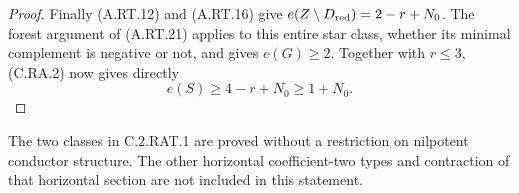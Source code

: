 \begin{proof}
Finally (A.RT.12) and (A.RT.16) give
$e(Z\setminus D_{\rm red})=2-r+N_0$.
The forest argument of (A.RT.21) applies to this entire
star class, whether its minimal complement is negative
or not, and gives $e(G)\ge2$.
Together with $r\le3$, (C.RA.2) now gives directly
\[
                 e(S)\ge4-r+N_0\ge1+N_0.
 \tag{C.RA.17}
\]
\end{proof}

The two classes in C.2.RAT.1 are proved without a restriction
on nilpotent conductor structure. The other horizontal
coefficient-two types and contraction of that horizontal
section are not included in this statement.



